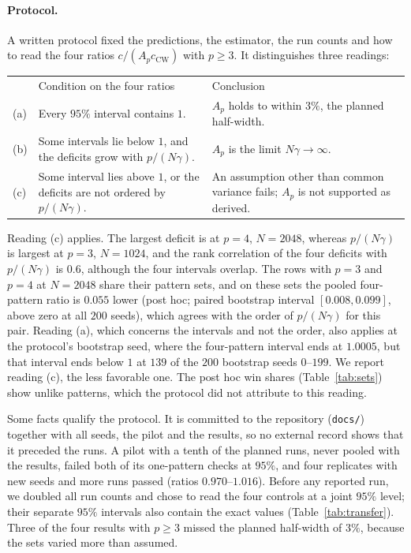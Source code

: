 \documentclass[final]{dynafront2026}
\begin{document}
\paragraph{Protocol.}
A written protocol fixed the predictions, the estimator, the run counts and
how to read the four ratios $c/(A_pc_{\mathrm{CW}})$ with $p\ge3$. It
distinguishes three readings:
\begin{center}
 \begin{tabular}{@{}lp{}p{}@{}}
 & Condition on the four ratios & Conclusion\\[2pt]
 (a) & Every $95\%$ interval contains $1$. & $A_p$ holds to within $3\%$, the planned half-width.\\
 (b) & Some intervals lie below $1$, and the deficits grow with $p/(N\gamma)$. & $A_p$ is the limit $N\gamma\to\infty$.\\
 (c) & Some interval lies above $1$, or the deficits are not ordered by $p/(N\gamma)$. & An assumption other than common variance fails; $A_p$ is not supported as derived.\\
 \end{tabular}
\end{center}
Reading (c) applies. The largest deficit is at $p=4$, $N=2048$, whereas
$p/(N\gamma)$ is largest at $p=3$, $N=1024$, and the rank correlation of the
four deficits with $p/(N\gamma)$ is $0.6$, although the four
intervals overlap. The rows with $p=3$ and $p=4$ at $N=2048$ share their
pattern sets, and on these sets the pooled four-pattern ratio is $0.055$ lower
(post hoc; paired bootstrap interval $[0.008,0.099]$, above zero at all $200$
seeds), which agrees with the order of $p/(N\gamma)$ for this pair. Reading (a), which concerns the intervals and not the order, also applies at the protocol's bootstrap seed, where the
four-pattern interval ends at $1.0005$, but that interval ends below $1$ at
$139$ of the $200$ bootstrap seeds $0$--$199$. We report reading (c), the
less favorable one. The post hoc win shares (Table~\ref{tab:sets}) show
unlike patterns, which the protocol did not attribute to this reading.

Some facts qualify the protocol. It is committed to the repository
(\texttt{docs/}) together with all seeds, the pilot and the results, so no external record shows that
it preceded the runs. A pilot with a tenth of the planned runs, never pooled
with the results, failed both of its one-pattern checks at $95\%$, and four
replicates with new seeds and more runs passed (ratios $0.970$--$1.016$). Before any reported run,
we doubled all run counts and chose to read the four controls at a joint
$95\%$ level; their separate $95\%$ intervals also contain the exact values
(Table~\ref{tab:transfer}). Three of the four results with $p\ge3$ missed the
planned half-width of $3\%$, because the sets varied more than assumed.
\end{document}
